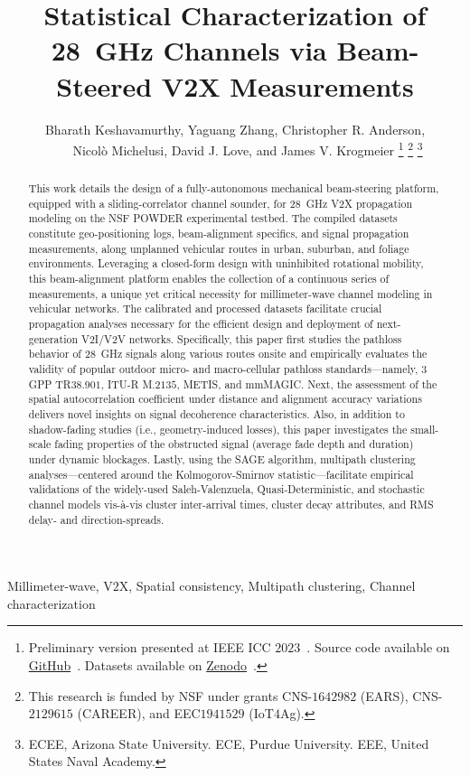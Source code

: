 \documentclass[10pt, twocolumn]{IEEEtran}
\title{Statistical Characterization of \SI{28}{\giga\hertz} Channels via Beam-Steered V2X Measurements}
\author{Bharath Keshavamurthy\IEEEauthorrefmark{1}, Yaguang Zhang\IEEEauthorrefmark{2}, Christopher R. Anderson\IEEEauthorrefmark{3},\\\ \ \ \ Nicol\`{o} Michelusi\IEEEauthorrefmark{1}, David J. Love\IEEEauthorrefmark{2}, and James V. Krogmeier\IEEEauthorrefmark{2}
\thanks{Preliminary version presented at IEEE ICC $2023$~\cite{SPAVE_ICC}. Source code available on \href{https://github.com/bharathkeshavamurthy/SPAVE-28G}{GitHub}~\cite{SPAVE_Source_Code}. Datasets available on \href{https://doi.org/10.5281/zenodo.7178597}{Zenodo}~\cite{SPAVE_Dataset}.}
\thanks{This research is funded by NSF under grants CNS-$1642982$ (EARS), CNS-$2129615$ (CAREER), and EEC$1941529$ (IoT$4$Ag).}
\thanks{\IEEEauthorrefmark{1}ECEE, Arizona State University. \IEEEauthorrefmark{2}ECE, Purdue University. \IEEEauthorrefmark{3}EEE, United States Naval Academy.}
\vspace{-5mm}
}
\begin{document}

\maketitle
\thispagestyle{plain}
\pagestyle{plain}
\vspace{-5mm}

\begin{abstract}
This work details the design of a fully-autonomous mechanical beam-steering platform, equipped with a sliding-correlator channel sounder, for \SI{28}{\giga\hertz} V2X propagation modeling on the NSF POWDER experimental testbed. The compiled datasets constitute geo-positioning logs, beam-alignment specifics, and signal propagation measurements, along unplanned vehicular routes in urban, suburban, and foliage environments. Leveraging a closed-form design with uninhibited rotational mobility, this beam-alignment platform enables the collection of a continuous series of measurements, a unique yet critical necessity for millimeter-wave channel modeling in vehicular networks. The calibrated and processed datasets facilitate crucial propagation analyses necessary for the efficient design and deployment of next-generation V$2$I/V$2$V networks. Specifically, this paper first studies the pathloss behavior of \SI{28}{\giga\hertz} signals along various routes onsite and empirically evaluates the validity of popular outdoor micro- and macro-cellular pathloss standards---namely, $3$GPP TR$38.901$, ITU-R M$.2135$, METIS, and mmMAGIC. Next, the assessment of the spatial autocorrelation coefficient under distance and alignment accuracy variations delivers novel insights on signal decoherence characteristics. Also, in addition to shadow-fading studies (i.e., geometry-induced losses), this paper investigates the small-scale fading properties of the obstructed signal (average fade depth and duration) under dynamic blockages. Lastly, using the SAGE algorithm, multipath clustering analyses---centered around the Kolmogorov-Smirnov statistic---facilitate empirical validations of the widely-used Saleh-Valenzuela, Quasi-Deterministic, and stochastic channel models vis-\`{a}-vis cluster inter-arrival times, cluster decay attributes, and RMS delay- and direction-spreads.
\end{abstract}

\begin{IEEEkeywords}
	Millimeter-wave, V$2$X, Spatial consistency, Multipath clustering, Channel characterization
\end{IEEEkeywords}
\end{document}
